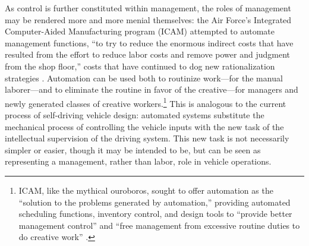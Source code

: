 As control is further constituted within management, the roles of
management may be rendered more and more menial themselves: the Air
Force's Integrated Computer-Aided Manufacturing program (ICAM)
attempted to automate
management functions, ``to try to reduce the enormous indirect costs
that have resulted from the effort to reduce labor costs and remove
power and judgment from the shop floor,'' costs that have continued to
dog new rationalization strategies \cite[p. 330]{nobleForces}. Automation
can be used both to routinize work---for the manual laborer---and to
eliminate the routine in favor of the creative---for managers and newly
generated classes of creative workers.\footnote{ICAM, like the mythical
ouroboros, sought to offer automation as the ``solution to the problems
generated by automation,'' providing automated scheduling functions,
inventory control, and design tools to ``provide better management
control'' and ``free management from excessive routine duties to do
creative work'' \cite[p. 330]{nobleForces}.} This is analogous to the
current process of self-driving vehicle design: automated systems
substitute the mechanical process of controlling the vehicle inputs
with the new task of the intellectual supervision of the driving
system. This new task is not necessarily simpler or easier, though it
may be intended to be, but can be seen as representing a management,
rather than labor, role in vehicle operations.


